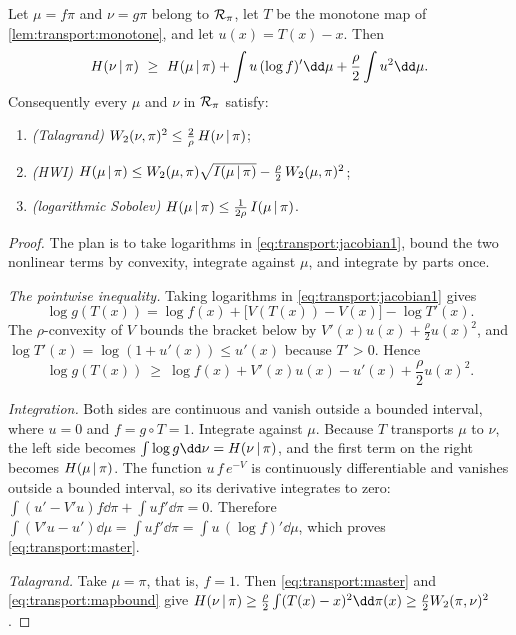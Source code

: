 \begin{refsection}
\begin{theorem}\label{thm:transport:master}
Let $\mu=f\pi$ and $\nu=g\pi$ belong to $\mathcal{R}_\pi$, let $T$ be the monotone map of \cref{lem:transport:monotone}, and let $u(x)=T(x)-x$. Then
\begin{equation}\label{eq:transport:master}
\transportH{\nu}{\pi}\ \ge\ \transportH{\mu}{\pi}+\int u\,(\log f)'\dd\mu+\frac{\rho}{2}\int u^2\dd\mu.
\end{equation}
Consequently every $\mu$ and $\nu$ in $\mathcal{R}_\pi$ satisfy:
\begin{enumerate}
\item \emph{(Talagrand)} $W_2(\nu,\pi)^2\le\frac{2}{\rho}\,H(\nu\,|\,\pi)$;
\item \emph{(HWI)} $H(\mu\,|\,\pi)\le W_2(\mu,\pi)\sqrt{I(\mu\,|\,\pi)}-\frac{\rho}{2}\,W_2(\mu,\pi)^2$;
\item \emph{(logarithmic Sobolev)} $H(\mu\,|\,\pi)\le\frac{1}{2\rho}\,I(\mu\,|\,\pi)$.
\end{enumerate}
\end{theorem}

\begin{proof}
The plan is to take logarithms in \eqref{eq:transport:jacobian1}, bound the two nonlinear terms by convexity, integrate against $\mu$, and integrate by parts once.

\emph{The pointwise inequality.} Taking logarithms in \eqref{eq:transport:jacobian1} gives
\[
\log g(T(x))=\log f(x)+\bigl[V(T(x))-V(x)\bigr]-\log T'(x).
\]
The $\rho$-convexity of $V$ bounds the bracket below by $V'(x)u(x)+\frac{\rho}{2}u(x)^2$, and $\log T'(x)=\log(1+u'(x))\le u'(x)$ because $T'>0$. Hence
\[
\log g(T(x))\ \ge\ \log f(x)+V'(x)u(x)-u'(x)+\frac{\rho}{2}u(x)^2.
\]

\emph{Integration.} Both sides are continuous and vanish outside a bounded interval, where $u=0$ and $f=g\circ T=1$. Integrate against $\mu$. Because $T$ transports $\mu$ to $\nu$, the left side becomes $\int\log g\dd\nu=\transportH{\nu}{\pi}$, and the first term on the right becomes $H(\mu\,|\,\pi)$. The function $u\,f\,e^{-V}$ is continuously differentiable and vanishes outside a bounded interval, so its derivative integrates to zero: $\int(u'-V'u)f\dd\pi+\int uf'\dd\pi=0$. Therefore $\int(V'u-u')\dd\mu=\int uf'\dd\pi=\int u\,(\log f)'\dd\mu$, which proves \eqref{eq:transport:master}.

\emph{Talagrand.} Take $\mu=\pi$, that is, $f=1$. Then \eqref{eq:transport:master} and \eqref{eq:transport:mapbound} give $\transportH{\nu}{\pi}\ge\frac{\rho}{2}\int(T(x)-x)^2\dd\pi(x)\ge\frac{\rho}{2}\transportW(\pi,\nu)^2$.


\end{proof}
\end{refsection}
